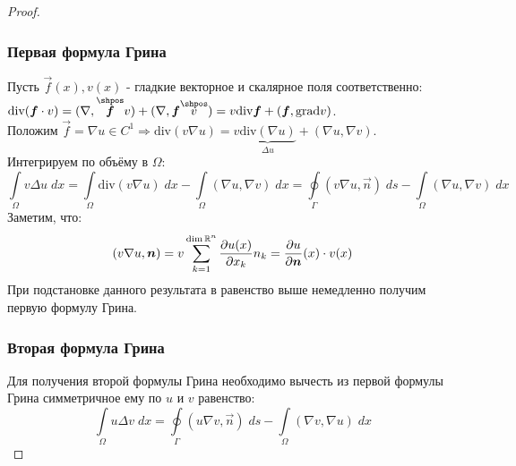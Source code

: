 \begin{proof}\ \\
\subsubsection{Первая формула Грина}
Пусть $\vec{f}(x), v(x)$ - гладкие векторное и скалярное поля соответственно: $\text{div}(\vec{f} \cdot v) = (\nabla, \overset{\shpos}{\vec{f}}v) + (\nabla, \vec{f}\overset{\shpos}{v}) = v\text{div} \vec{f} + (\vec{f}, \text{grad}{v})$. \\
Положим $\vec{f} = \nabla u \in C^1 \Rightarrow \text{div} (v \nabla u) = v \underbrace{\text{div}(\nabla u)}_{\Delta u} + (\nabla u, \nabla v)$. \\
Интегрируем по объёму в $\Omega$:
\begin{equation*}
	\int\limits_{\Omega} v \Delta u\;dx = 	\int\limits_{\Omega} \text{div}(v\nabla u)\;dx -\int\limits_{\Omega} (\nabla u, \nabla v)\;dx = \oint\limits_{\Gamma}(v \nabla u, \vec{n})\;ds - \int\limits_{\Omega}(\nabla u, \nabla v)\;dx
\end{equation*}
Заметим, что:
$$(v\nabla u, \boldsymbol{n}) = v \sum\limits_{k = 1}^{\dim \mathbb{R}^n}\dfrac{\partial u(x)}{\partial x_k} n_k = \dfrac{\partial u}{\partial \boldsymbol{n}}(x) \cdot v(x)$$
При подстановке данного результата в равенство выше немедленно получим первую формулу Грина.
\subsubsection{Вторая формула Грина}
Для получения второй формулы Грина необходимо вычесть из первой формулы Грина симметричное ему по $u$ и $v$ равенство:
$$\int\limits_{\Omega} u \Delta v\;dx = \oint\limits_{\Gamma}(u \nabla v, \vec{n})\;ds - \int\limits_{\Omega}(\nabla v, \nabla u)\;dx$$
\end{proof}

